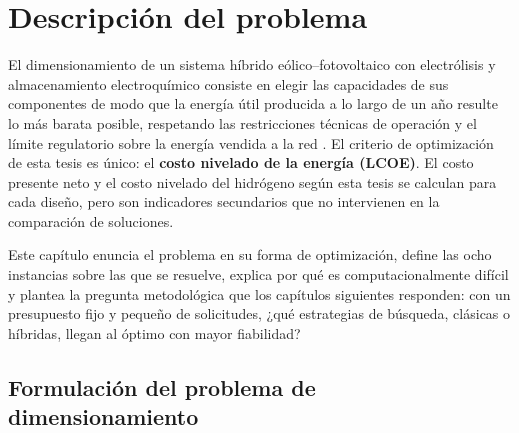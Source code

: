 \chapter{Descripción del problema}

El dimensionamiento de un sistema híbrido eólico--fotovoltaico con electrólisis y almacenamiento electroquímico consiste en elegir las capacidades de sus componentes de modo que la energía útil producida a lo largo de un año resulte lo más barata posible, respetando las restricciones técnicas de operación y el límite regulatorio sobre la energía vendida a la red \cite{Khan2022Review,Li2024WPEB}. El criterio de optimización de esta tesis es único: el \textbf{costo nivelado de la energía (LCOE)}. El costo presente neto y el costo nivelado del hidrógeno según esta tesis se calculan para cada diseño, pero son indicadores secundarios que no intervienen en la comparación de soluciones.

Este capítulo enuncia el problema en su forma de optimización, define las ocho instancias sobre las que se resuelve, explica por qué es computacionalmente difícil y plantea la pregunta metodológica que los capítulos siguientes responden: con un presupuesto fijo y pequeño de solicitudes, ¿qué estrategias de búsqueda, clásicas o híbridas, llegan al óptimo con mayor fiabilidad?

\section{Formulación del problema de dimensionamiento}
\label{sec:formulacion}

